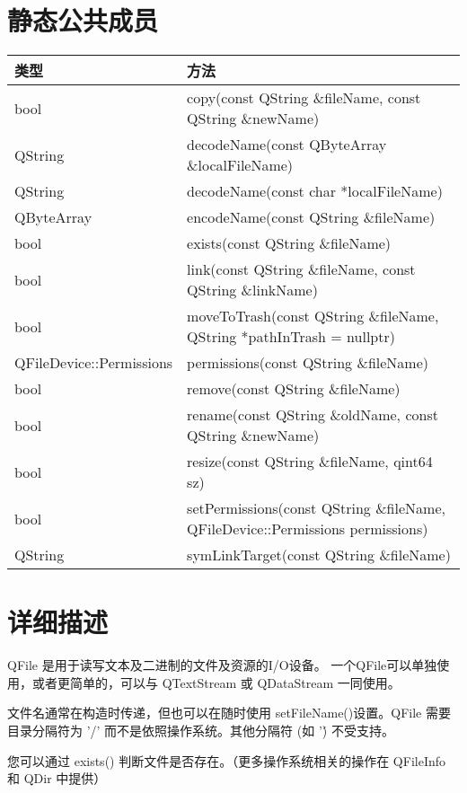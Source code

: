 \splitLine

\section{静态公共成员}

\begin{tabular}{|l|l|}
\hline
类型& 	方法\\
\hline
bool& 	copy(const QString \&fileName, const QString \&newName)\\
\hline
QString& 	decodeName(const QByteArray \&localFileName)\\
\hline
QString& 	decodeName(const char *localFileName)\\
\hline
QByteArray& 	encodeName(const QString \&fileName)\\
\hline
bool& 	exists(const QString \&fileName)\\
\hline
bool& 	link(const QString \&fileName, const QString \&linkName)\\
\hline
bool& 	moveToTrash(const QString \&fileName, QString *pathInTrash =
      nullptr)\\
\hline
QFileDevice::Permissions &	permissions(const QString \&fileName)\\
\hline
bool& 	remove(const QString \&fileName)\\
\hline
bool& 	rename(const QString \&oldName, const QString \&newName)\\
\hline
bool& 	resize(const QString \&fileName, qint64 sz)\\
\hline
bool& 	setPermissions(const QString \&fileName, QFileDevice::Permissions permissions)\\
\hline
QString& 	symLinkTarget(const QString \&fileName)\\
\hline
\end{tabular}


\splitLine

\section{详细描述}

QFile 是用于读写文本及二进制的文件及资源的I/O设备。 一个QFile可以单独使用，或者更简单的，可以与 QTextStream 或 QDataStream 一同使用。

文件名通常在构造时传递，但也可以在随时使用 setFileName()设置。QFile 需要目录分隔符为 '/' 而不是依照操作系统。其他分隔符 (如 '\') 不受支持。

您可以通过 exists() 判断文件是否存在。（更多操作系统相关的操作在 QFileInfo 和 QDir 中提供）

